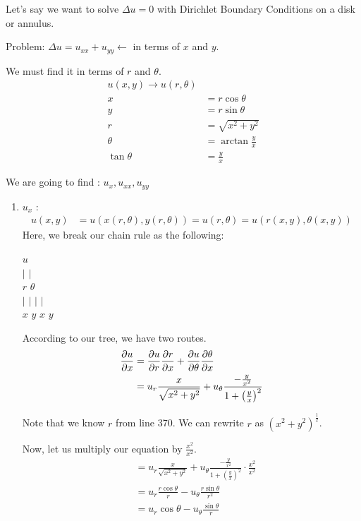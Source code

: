 \documentclass{article}
\begin{document}

Let's say we want to solve $\Delta u = 0$ with Dirichlet Boundary Conditions on a disk or annulus.

Problem: $\Delta u = u_{xx} + u_{yy} \leftarrow $ in terms of $x$ and $y$.

We must find it in terms of $r$ and $\theta$.
%
\begin{align}
  u(x, y) \rightarrow u(r, \theta)\\
  x & = r \cos \theta\\
  y & = r \sin \theta\\
  r & = \sqrt{x^2 + y^2}\\
  \theta & = \arctan \frac{y}{x}\\
  \tan \theta & = \frac{y}{x}
\end{align}

We are going to find : $u_x, u_{xx}, u_{yy}$
%
\begin{enumerate}
  \item $u_x$ :
  \begin{align}
    u(x, y) & = u( x(r, \theta), y(r, \theta)) = u(r, \theta) = u(r(x, y), \theta(x, y))
  \end{align}
  Here, we break our chain rule as the following:
  \begin{center}
    $u$\\
    $|$ \quad \quad $|$\\
    $r$ \quad \quad $\theta$\\
    $|$ \quad $|$ \quad $|$ \quad $|$\\
    $x$ \quad $y$ \quad $x$ \quad $y$
  \end{center}

  According to our tree, we have two routes.
  \begin{align}
    \frac{\partial u}{\partial x} & = \frac{\partial u}{\partial r} \frac{\partial r}{\partial x} + \frac{\partial u}{\partial \theta} \frac{\partial \theta}{\partial x}\\
    & = u_r \frac{x}{\sqrt{x^2 + y^2}} + u_\theta \frac{- \frac{y}{x^2}}{1 + \left( \frac{y}{x}\right)^2}
  \end{align}

  Note that we know $r$ from line 370. We can rewrite $r$ as $(x^2 + y^2)^{\frac{1}{2}}$.

  Now, let us multiply our equation by $\frac{x^2}{x^2}$.
  \begin{align}
    & = u_r \frac{x}{\sqrt{x^2 + y^2}} + u_\theta \frac{- \frac{y}{x^2}}{1 + \left( \frac{y}{x}\right)^2} \cdot \frac{x^2}{x^2}\\
    & = u_r \frac{r \cos\theta}{r} - u_\theta \frac{r \sin \theta}{r^2}\\
    & = u_r \cos\theta - u_\theta \frac{\sin \theta}{r}
  \end{align}
\end{enumerate}
\end{document}
